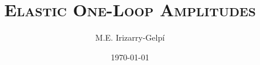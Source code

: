 \documentclass[letterpaper, 12pt]{report}
\begin{document}
\title{\Huge\textsc{Elastic One-Loop Amplitudes}}
\author{M.E. Irizarry-Gelp\'{i}}
\date{\today}

\maketitle
\tableofcontents





\end{document}
